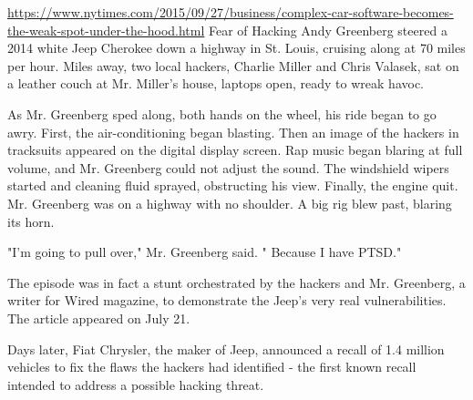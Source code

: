 \begin{tbd}
\url{https://www.nytimes.com/2015/09/27/business/complex-car-software-becomes-the-weak-spot-under-the-hood.html}
Fear of Hacking
Andy Greenberg steered a 2014 white Jeep Cherokee down a highway in St. Louis, cruising along at 70 miles per hour. Miles away, two local hackers, Charlie Miller and Chris Valasek, sat on a leather couch at Mr. Miller's house, laptops open, ready to wreak havoc.

As Mr. Greenberg sped along, both hands on the wheel, his ride began to go awry. First, the air-conditioning began blasting. Then an image of the hackers in tracksuits appeared on the digital display screen. Rap music began blaring at full volume, and Mr. Greenberg could not adjust the sound. The windshield wipers started and cleaning fluid sprayed, obstructing his view. Finally, the engine quit.
Mr. Greenberg was on a highway with no shoulder. A big rig blew past, blaring its horn.

"I'm going to pull over," Mr. Greenberg said. " Because I have PTSD."

The episode was in fact a stunt orchestrated by the hackers and Mr. Greenberg, a writer for Wired magazine, to demonstrate the Jeep's very real vulnerabilities. The article appeared on July 21.

Days later, Fiat Chrysler, the maker of Jeep, announced a recall of 1.4 million vehicles to fix the flaws the hackers had identified - the first known recall intended to address a possible hacking threat.
\end{tbd}
